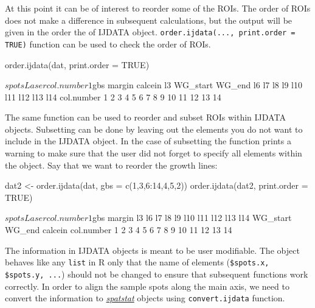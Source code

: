\documentclass[11pt, a4paper]{article}
\newcommand{\mnote}[1]
{\marginnote{\footnotesize \raggedright \texttt{#1}}}
\begin{document}
\mnote{\mbox{order}.
\mbox{ijdata}} At this point it can be of interest to reorder some of the ROIs. The order of ROIs does not make a difference in subsequent calculations, but the output will be given in the order the of IJDATA object. \texttt{order.ijdata(..., print.order = TRUE)} function can be used to check the order of ROIs.

\begin{Schunk}
\begin{Sinput}
 order.ijdata(dat, print.order = TRUE)
\end{Sinput}
\begin{Soutput}
$spots
           Laser
col.number     1

$gbs
           margin calcein l3 WG_start WG_end l6 l7 l8 l9 l10 l11 l12 l13 l14
col.number      1       2  3        4      5  6  7  8  9  10  11  12  13  14
\end{Soutput}
\end{Schunk}

The same function can be used to reorder and subset ROIs within IJDATA objects. Subsetting can be done by leaving out the elements you do not want to include in the IJDATA object. In the case of subsetting the function prints a warning to make sure that the user did not forget to specify all elements within the object. Say that we want to reorder the growth lines:

\begin{Schunk}
\begin{Sinput}
 dat2 <- order.ijdata(dat, gbs = c(1,3,6:14,4,5,2))
 order.ijdata(dat2, print.order = TRUE)
\end{Sinput}
\begin{Soutput}
$spots
           Laser
col.number     1

$gbs
           margin l3 l6 l7 l8 l9 l10 l11 l12 l13 l14 WG_start WG_end calcein
col.number      1  2  3  4  5  6   7   8   9  10  11       12     13      14
\end{Soutput}
\end{Schunk}

\mnote{\mbox{convert}.
\mbox{ijdata}} The information in IJDATA objects is meant to be user modifiable. The object behaves like any \texttt{list} in R only that the name of elements (\texttt{\$spots.x, \$spots.y, ...}) should not be changed to ensure that subsequent functions work correctly. In order to align the sample spots along the main axis, we need to convert the information to \href{http://www.spatstat.org/spatstat/}{\textit{spatstat}} \citep{Baddeley2005} objects using \texttt{convert.ijdata} function.
\end{document}
